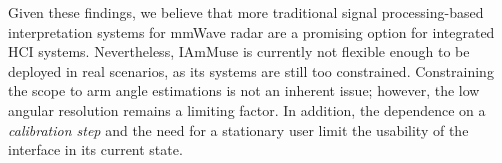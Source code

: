 Given these findings, we believe that more traditional signal processing-based interpretation systems for mmWave radar are a promising option for integrated HCI systems.
Nevertheless, IAmMuse is currently not flexible enough to be deployed in real scenarios, as its systems are still too constrained.
Constraining the scope to arm angle estimations is not an inherent issue; however, the low angular resolution remains a limiting factor.
In addition, the dependence on a \textit{calibration step} and the need for a stationary user limit the usability of the interface in its current state.






